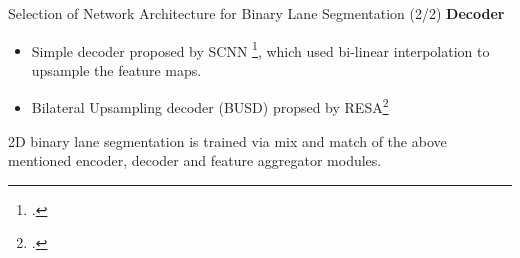\documentclass[aspectratio=169]{beamer}
\begin{document}
\begin{frame}{Selection of Network Architecture for Binary Lane Segmentation (2/2)}
    \textbf{Decoder}
    \begin{itemize}
        \item Simple decoder proposed by SCNN \footcite{}, which used bi-linear interpolation to upsample the feature maps.
        \item Bilateral Upsampling decoder (BUSD) propsed by RESA\footcite{}
    \end{itemize}


    2D binary lane segmentation is trained via mix and match of the above mentioned encoder, decoder and feature aggregator modules.

\end{frame}
\end{document}
